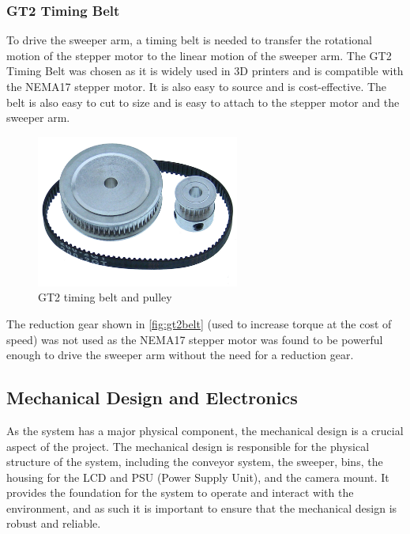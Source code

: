 \subsubsection{GT2 Timing Belt}
To drive the sweeper arm, a timing belt is needed to transfer the rotational motion of the stepper motor to the linear motion of the sweeper arm. The GT2 Timing Belt was chosen as it is widely used in 3D printers and is compatible with the NEMA17 stepper motor. It is also easy to source and is cost-effective. The belt is also easy to cut to size and is easy to attach to the stepper motor and the sweeper arm.

\begin{figure}[H]
    \begin{minipage}[h]{\textwidth}
        \centering
        \includegraphics[height=5cm]{imgs/parts/gt2.jpg}
        \caption{GT2 timing belt and pulley \cite{gt2}}
        \label{fig:gt2belt}
    \end{minipage}
\end{figure}

The reduction gear shown in \autoref{fig:gt2belt} (used to increase torque at the cost of speed) was not used as the NEMA17 stepper motor was found to be powerful enough to drive the sweeper arm without the need for a reduction gear.
 
\subsection{Mechanical Design and Electronics}
\label{sec:mechanical-design}
As the system has a major physical component, the mechanical design is a crucial aspect of the project. The mechanical design is responsible for the physical structure of the system, including the conveyor system, the sweeper, bins, the housing for the LCD and PSU (Power Supply Unit), and the camera mount. It provides the foundation for the system to operate and interact with the environment, and as such it is important to ensure that the mechanical design is robust and reliable.

